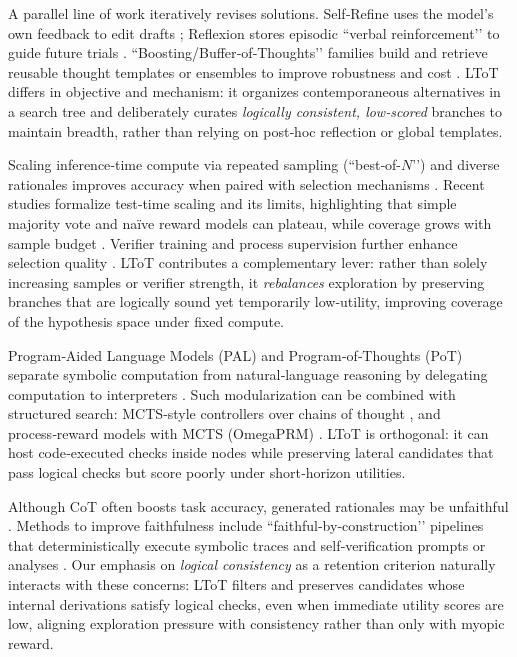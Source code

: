 \documentclass{article}
\begin{document}
A parallel line of work iteratively revises solutions. Self‑Refine uses the model’s own feedback to edit drafts \citep{madaan2023selfrefine}; Reflexion stores episodic “verbal reinforcement’’ to guide future trials \citep{shinn2023reflexion}. “Boosting/Buffer‑of‑Thoughts’’ families build and retrieve reusable thought templates or ensembles to improve robustness and cost \citep{chen2024bot,yang2024bot}. LToT differs in objective and mechanism: it organizes contemporaneous alternatives in a search tree and deliberately curates \emph{logically consistent, low‑scored} branches to maintain breadth, rather than relying on post‑hoc reflection or global templates.

Scaling inference‑time compute via repeated sampling (“best‑of-\(N\)’’) and diverse rationales improves accuracy when paired with selection mechanisms \citep{cobbe2021verifier,wang2022selfconsistency}. Recent studies formalize test‑time scaling and its limits, highlighting that simple majority vote and naïve reward models can plateau, while coverage grows with sample budget \citep{brown2024monkeys}. Verifier training and process supervision further enhance selection quality \citep{lightman2023verify,zhang2024generativeverifiers}. LToT contributes a complementary lever: rather than solely increasing samples or verifier strength, it \emph{rebalances} exploration by preserving branches that are logically sound yet temporarily low‑utility, improving coverage of the hypothesis space under fixed compute.

Program‑Aided Language Models (PAL) and Program‑of‑Thoughts (PoT) separate symbolic computation from natural‑language reasoning by delegating computation to interpreters \citep{gao2022pal,chen2022pot}. Such modularization can be combined with structured search: MCTS‑style controllers over chains of thought \citep{xie2024mcts}, and process‑reward models with MCTS (OmegaPRM) \citep{luo2024omegaprm}. LToT is orthogonal: it can host code‑executed checks inside nodes while preserving lateral candidates that pass logical checks but score poorly under short‑horizon utilities.

Although CoT often boosts task accuracy, generated rationales may be unfaithful \citep{turpin2023dontsaysay,lanham2023measurefaithfulness}. Methods to improve faithfulness include “faithful‑by‑construction’’ pipelines that deterministically execute symbolic traces \citep{lyu2023faithfulcot} and self‑verification prompts or analyses \citep{weng2022selfverification}. Our emphasis on \emph{logical consistency} as a retention criterion naturally interacts with these concerns: LToT filters and preserves candidates whose internal derivations satisfy logical checks, even when immediate utility scores are low, aligning exploration pressure with consistency rather than only with myopic reward.
\end{document}
